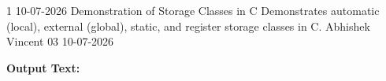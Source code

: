 \clearpage
{}
\label{prog:01}
\programhead
  {1}
  {10-07-2026}
  {Demonstration of Storage Classes in C}
  {Demonstrates automatic (local), external (global), static, and register storage classes in C.}
  {Abhishek Vincent}
  {03}
  {10-07-2026}

\divider
\textbf{Output Text:}\par
\vspace{2pt}

